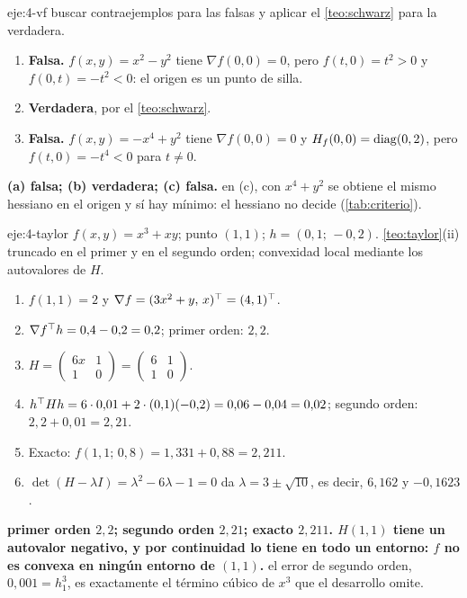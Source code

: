 \begin{solucion}{eje:4-vf}
\planteamiento buscar contraejemplos para las falsas y aplicar el \cref{teo:schwarz} para la verdadera.
\pasos
\begin{enumerate}[label=(\alph*)]
  \item \textbf{Falsa.} $f(x,y)=x^{2}-y^{2}$ tiene $\nabla f(0,0)=0$, pero $f(t,0)=t^{2}>0$ y $f(0,t)=-t^{2}<0$: el origen es un punto de silla.
  \item \textbf{Verdadera}, por el \cref{teo:schwarz}.
  \item \textbf{Falsa.} $f(x,y)=-x^{4}+y^{2}$ tiene $\nabla f(0,0)=0$ y $H_f(0,0)=\operatorname{diag}(0,2)$, pero $f(t,0)=-t^{4}<0$ para $t\ne 0$.
\end{enumerate}
\resultado \textbf{(a) falsa; (b) verdadera; (c) falsa.}
\comprobacion en (c), con $x^{4}+y^{2}$ se obtiene el mismo hessiano en el origen y sí hay mínimo: el hessiano no decide (\cref{tab:criterio}).
\end{solucion}

\begin{solucion}{eje:4-taylor}
\datos $f(x,y)=x^{3}+xy$; punto $(1,1)$; $h=(0{,}1;\,-0{,}2)$.
\planteamiento \cref{teo:taylor}(ii) truncado en el primer y en el segundo orden; convexidad local mediante los autovalores de $H$.
\pasos
\begin{enumerate}[label=\arabic*.]
  \item $f(1,1)=2$ y $\nabla f=(3x^{2}+y,\,x)^{\top}=(4,1)^{\top}$.
  \item $\nabla f^{\top} h=0{,}4-0{,}2=0{,}2$; primer orden: $2{,}2$.
  \item $H=\begin{pmatrix}6x&1\\1&0\end{pmatrix}=\begin{pmatrix}6&1\\1&0\end{pmatrix}$.
  \item $h^{\top} Hh=6\cdot 0{,}01+2\cdot(0{,}1)(-0{,}2)=0{,}06-0{,}04=0{,}02$; segundo orden: $2{,}2+0{,}01=2{,}21$.
  \item Exacto: $f(1{,}1;\,0{,}8)=1{,}331+0{,}88=2{,}211$.
  \item $\det(H-\lambda I)=\lambda^{2}-6\lambda-1=0$ da $\lambda=3\pm\sqrt{10}$, es decir, $6{,}162$ y $-0{,}1623$.
\end{enumerate}
\resultado \textbf{primer orden $2{,}2$; segundo orden $2{,}21$; exacto $2{,}211$. $H(1,1)$ tiene un autovalor negativo, y por continuidad lo tiene en todo un entorno: $f$ no es convexa en ningún entorno de $(1,1)$.}
\comprobacion el error de segundo orden, $0{,}001=h_1^{3}$, es exactamente el término cúbico de $x^{3}$ que el desarrollo omite.
\end{solucion}

